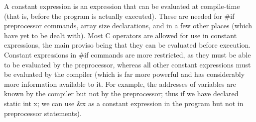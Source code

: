      A {\kc constant  expression\/} is an expression that can be
evaluated at compile-time (that  is, before the program is actually
executed). These are needed for {\cd \#if} preprocessor  commands,
array  size declarations,  and in a  few other places (which have  yet
to  be dealt  with). Most  C operators are allowed for use in
constant expressions, the main proviso being that they can be
evaluated before execution. Constant  expressions in  {\cd \#if}
commands are more restricted, as they must be  able to  be evaluated
by the preprocessor, whereas all other constant expressions must  be
evaluated by the compiler (which is far more powerful and has
considerably  more information available to it. For example, the
addresses of variables are known by the compiler but not by the
preprocessor; thus if we have declared  {\cd static int  x;} we  can
use  {\cd \&x} as  a constant expression in the program but not in
preprocessor statements).

